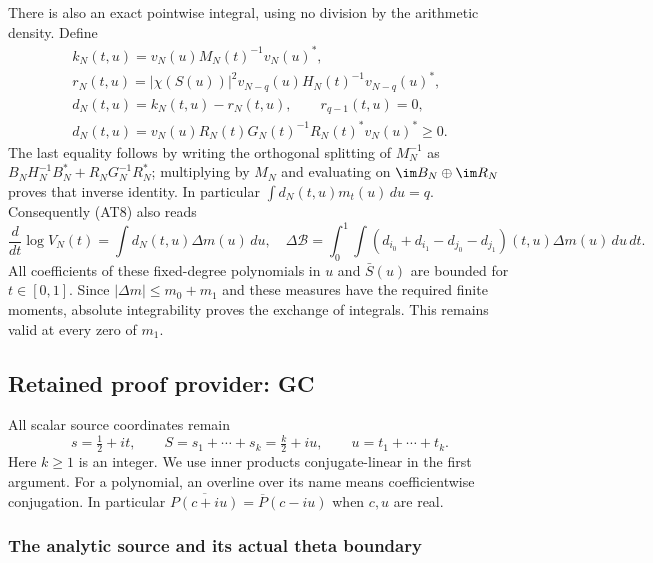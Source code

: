 \documentclass[11pt,a4paper]{article}
\begin{document}
There is also an exact pointwise integral, using no division by
the arithmetic density. Define
\[
 \begin{gathered}
 k_N(t,u)=v_N(u)M_N(t)^{-1}v_N(u)^*,\\
 r_N(t,u)=|\chi(S(u))|^2
 v_{N-q}(u)H_N(t)^{-1}v_{N-q}(u)^*,\\
 d_N(t,u)=k_N(t,u)-r_N(t,u),\qquad r_{q-1}(t,u)=0,\\
 d_N(t,u)=v_N(u)R_N(t)G_N(t)^{-1}R_N(t)^*v_N(u)^*\ge0.
                                                        \end{gathered}
 \tag{AT16}
\]
The last equality follows by writing the orthogonal splitting
of $M_N^{-1}$ as
$B_NH_N^{-1}B_N^*+R_NG_N^{-1}R_N^*$; multiplying by $M_N$
and evaluating on $\im B_N\oplus\im R_N$ proves that inverse
identity. In particular $\int d_N(t,u)m_t(u)\,du=q$.
Consequently (AT8) also reads
\[
 \frac{d}{dt}\log V_N(t)=\int d_N(t,u)\Delta m(u)\,du,
\quad
 \Delta\mathcal B=\int_0^1\int
 (d_{i_0}+d_{i_1}-d_{j_0}-d_{j_1})(t,u)\Delta m(u)\,du\,dt.
                                                        \tag{AT17}
\]
All coefficients of these fixed-degree polynomials in $u$ and
$\bar S(u)$ are bounded for $t\in[0,1]$. Since
$|\Delta m|\le m_0+m_1$ and these measures have the required
finite moments, absolute integrability proves the exchange of
integrals. This remains valid at every zero of $m_1$.


\clearpage
\subsection*{Retained proof provider: GC}

All scalar source coordinates remain
\[
 s=\tfrac12+it,\qquad S=s_1+\cdots+s_k=\tfrac k2+iu,
 \qquad u=t_1+\cdots+t_k.                                      \tag{GC.1}
\]
Here $k\ge1$ is an integer. We use inner products conjugate-linear in
the first argument. For a polynomial, an overline over its name means
coefficientwise conjugation. In particular
$\overline{P(c+iu)}=\overline P(c-iu)$ when $c,u$ are real.

\subsubsection{The analytic source and its actual theta boundary}
\end{document}
